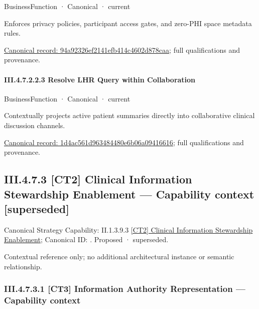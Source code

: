 \label{element:94a92326ef2141efb414c4602d878caa}
{\small BusinessFunction · Canonical · current}\par

Enforces privacy policies, participant access gates, and zero-PHI space metadata rules.


{\footnotesize \href{../../../../../../../continuum/business/business-function/94a92326ef2141efb414c4602d878caa.md}{Canonical record: 94a92326ef2141efb414c4602d878caa}; full qualifications and provenance.}\par
\paragraph*{III.4.7.2.2.3 Resolve LHR Query within Collaboration}
\label{navigation:III.4.7.2.2.3}

\label{element:1d4ac561d963484480e6b06a09416616}
{\small BusinessFunction · Canonical · current}\par

Contextually projects active patient summaries directly into collaborative clinical discussion channels.


{\footnotesize \href{../../../../../../../continuum/business/business-function/1d4ac561d963484480e6b06a09416616.md}{Canonical record: 1d4ac561d963484480e6b06a09416616}; full qualifications and provenance.}\par
\subsection*{III.4.7.3 [CT2] Clinical Information Stewardship Enablement — Capability context [superseded]}
\label{navigation:III.4.7.3}

{\small Canonical Strategy Capability: II.1.3.9.3 \hyperref[element:3811c758ff2140c39a801bf89f75098a]{[CT2] Clinical Information Stewardship Enablement}; Canonical ID: \texttt{}. Proposed · superseded.}\par
Contextual reference only; no additional architectural instance or semantic relationship.\par
\subsubsection*{III.4.7.3.1 [CT3] Information Authority Representation — Capability context}
\label{navigation:III.4.7.3.1}

